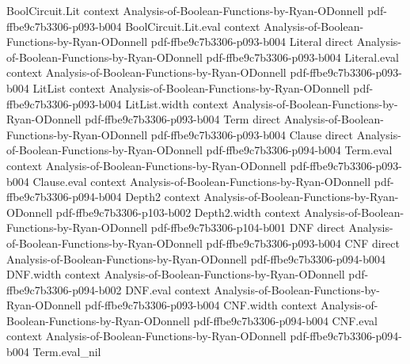 \begin{lemma}
\leanok
{}
\label{BooleanAnalysis.Hypercontractivity.bonami_algebra}
\proofstep
  {BoolCircuit.Lit}
  {context}
  {Analysis-of-Boolean-Functions-by-Ryan-ODonnell}
  {pdf-ffbe9c7b3306-p093-b004}
\proofstep
  {BoolCircuit.Lit.eval}
  {context}
  {Analysis-of-Boolean-Functions-by-Ryan-ODonnell}
  {pdf-ffbe9c7b3306-p093-b004}
\proofstep
  {Literal}
  {direct}
  {Analysis-of-Boolean-Functions-by-Ryan-ODonnell}
  {pdf-ffbe9c7b3306-p093-b004}
\proofstep
  {Literal.eval}
  {context}
  {Analysis-of-Boolean-Functions-by-Ryan-ODonnell}
  {pdf-ffbe9c7b3306-p093-b004}
\proofstep
  {LitList}
  {context}
  {Analysis-of-Boolean-Functions-by-Ryan-ODonnell}
  {pdf-ffbe9c7b3306-p093-b004}
\proofstep
  {LitList.width}
  {context}
  {Analysis-of-Boolean-Functions-by-Ryan-ODonnell}
  {pdf-ffbe9c7b3306-p093-b004}
\proofstep
  {Term}
  {direct}
  {Analysis-of-Boolean-Functions-by-Ryan-ODonnell}
  {pdf-ffbe9c7b3306-p093-b004}
\proofstep
  {Clause}
  {direct}
  {Analysis-of-Boolean-Functions-by-Ryan-ODonnell}
  {pdf-ffbe9c7b3306-p094-b004}
\proofstep
  {Term.eval}
  {context}
  {Analysis-of-Boolean-Functions-by-Ryan-ODonnell}
  {pdf-ffbe9c7b3306-p093-b004}
\proofstep
  {Clause.eval}
  {context}
  {Analysis-of-Boolean-Functions-by-Ryan-ODonnell}
  {pdf-ffbe9c7b3306-p094-b004}
\proofstep
  {Depth2}
  {context}
  {Analysis-of-Boolean-Functions-by-Ryan-ODonnell}
  {pdf-ffbe9c7b3306-p103-b002}
\proofstep
  {Depth2.width}
  {context}
  {Analysis-of-Boolean-Functions-by-Ryan-ODonnell}
  {pdf-ffbe9c7b3306-p104-b001}
\proofstep
  {DNF}
  {direct}
  {Analysis-of-Boolean-Functions-by-Ryan-ODonnell}
  {pdf-ffbe9c7b3306-p093-b004}
\proofstep
  {CNF}
  {direct}
  {Analysis-of-Boolean-Functions-by-Ryan-ODonnell}
  {pdf-ffbe9c7b3306-p094-b004}
\proofstep
  {DNF.width}
  {context}
  {Analysis-of-Boolean-Functions-by-Ryan-ODonnell}
  {pdf-ffbe9c7b3306-p094-b002}
\proofstep
  {DNF.eval}
  {context}
  {Analysis-of-Boolean-Functions-by-Ryan-ODonnell}
  {pdf-ffbe9c7b3306-p093-b004}
\proofstep
  {CNF.width}
  {context}
  {Analysis-of-Boolean-Functions-by-Ryan-ODonnell}
  {pdf-ffbe9c7b3306-p094-b004}
\proofstep
  {CNF.eval}
  {context}
  {Analysis-of-Boolean-Functions-by-Ryan-ODonnell}
  {pdf-ffbe9c7b3306-p094-b004}
\proofstep
  {Term.eval_nil}

\end{lemma}
